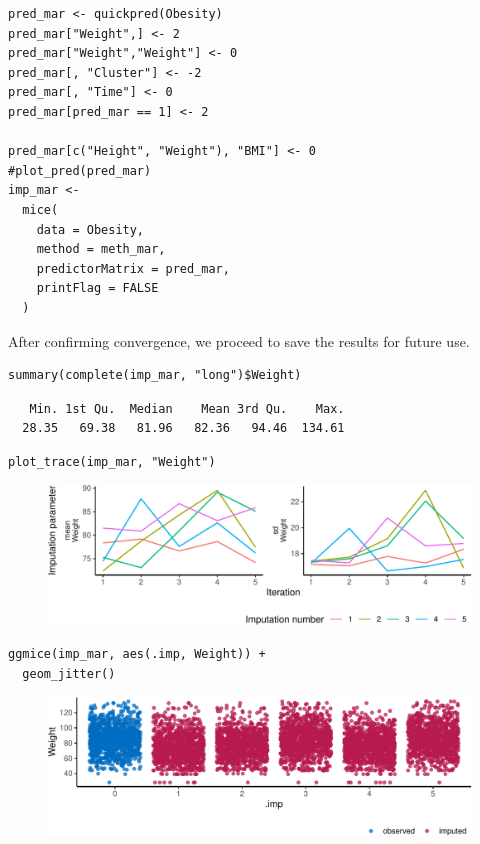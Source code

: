 \documentclass[
  article]{jss}
\begin{document}
\begin{verbatim}
pred_mar <- quickpred(Obesity)
pred_mar["Weight",] <- 2
pred_mar["Weight","Weight"] <- 0
pred_mar[, "Cluster"] <- -2 
pred_mar[, "Time"] <- 0
pred_mar[pred_mar == 1] <- 2

pred_mar[c("Height", "Weight"), "BMI"] <- 0
#plot_pred(pred_mar)
imp_mar <-
  mice(
    data = Obesity,
    method = meth_mar,
    predictorMatrix = pred_mar,
    printFlag = FALSE
  )
\end{verbatim}

After confirming convergence, we proceed to save the results for future
use.

\begin{verbatim}
summary(complete(imp_mar, "long")$Weight)
\end{verbatim}

\begin{verbatim}
   Min. 1st Qu.  Median    Mean 3rd Qu.    Max. 
  28.35   69.38   81.96   82.36   94.46  134.61 
\end{verbatim}

\begin{verbatim}
plot_trace(imp_mar, "Weight")
\end{verbatim}

\begin{figure}[h]

{\centering \includegraphics{manuscript_files/figure-pdf/obesity-predmar_pmm1-1.pdf}

}

\end{figure}

\begin{verbatim}
ggmice(imp_mar, aes(.imp, Weight)) + 
  geom_jitter()
\end{verbatim}

\begin{figure}[h]

{\centering \includegraphics{manuscript_files/figure-pdf/obesity-predmar_pmm1-2.pdf}

}

\end{figure}
\end{document}
